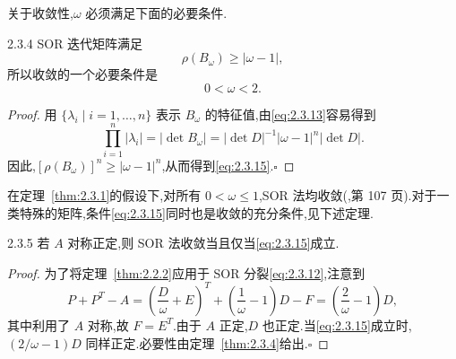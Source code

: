 关于收敛性,\(\omega\) 必须满足下面的必要条件.

\begin{theorem}[Kahan]{2.3.4}
SOR 迭代矩阵满足
\begin{equation}\label{eq:2.3.14}
  \rho(B_\omega)\ge|\omega-1|,
\end{equation}
所以收敛的一个必要条件是
\begin{equation}\label{eq:2.3.15}
  0<\omega<2.
\end{equation}
\end{theorem}

\begin{proof}
用 \(\{\lambda_i\mid i=1,\ldots,n\}\) 表示 \(B_\omega\) 的特征值,由\eqref{eq:2.3.13}容易得到
\[
  \prod_{i=1}^n|\lambda_i|=|\det B_\omega|
  =|\det D|^{-1}|\omega-1|^n|\det D|.
\]
因此,\([\rho(B_\omega)]^n\ge|\omega-1|^n\),从而得到\eqref{eq:2.3.15}.\hfill\(\square\)
\end{proof}

在定理~\ref{thm:2.3.1}的假设下,对所有 \(0<\omega\le1\),SOR 法均收敛(,第 107 页).对于一类特殊的矩阵,条件\eqref{eq:2.3.15}同时也是收敛的充分条件,见下述定理.

\begin{theorem}{2.3.5}
若 \(A\) 对称正定,则 SOR 法收敛当且仅当\eqref{eq:2.3.15}成立.
\end{theorem}

\begin{proof}
为了将定理~\ref{thm:2.2.2}应用于 SOR 分裂\eqref{eq:2.3.12},注意到
\[
  P+P^T-A=\left(\frac D\omega+E\right)^T+
    \left(\frac1\omega-1\right)D-F
  =\left(\frac2\omega-1\right)D,
\]
其中利用了 \(A\) 对称,故 \(F=E^T\).由于 \(A\) 正定,\(D\) 也正定.当\eqref{eq:2.3.15}成立时,\((2/\omega-1)D\) 同样正定.必要性由定理~\ref{thm:2.3.4}给出.\hfill\(\square\)
\end{proof}

